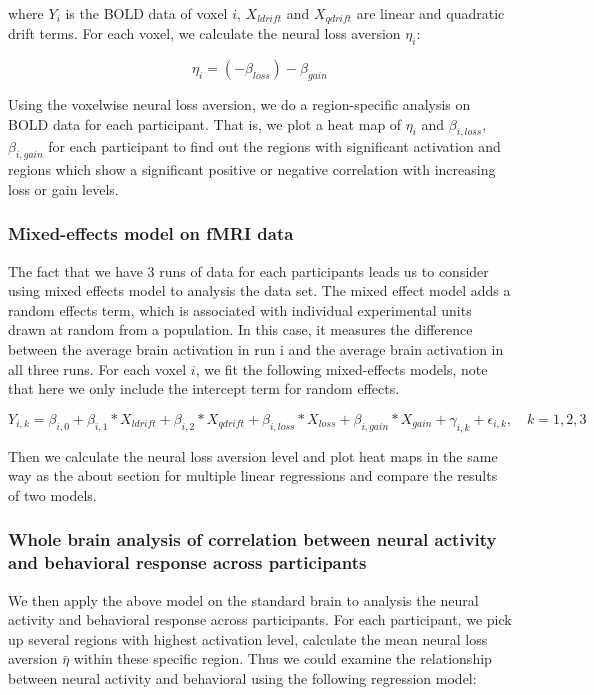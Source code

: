 \documentclass[11pt]{article}
\begin{document}
where $Y_{i}$ is the BOLD data of voxel $i$,  $X_{ldrift}$ and $X_{qdrift}$ are linear and quadratic drift terms. For each voxel, we calculate the 
neural loss aversion $\eta_i$:

\begin{equation}
\eta_i = (-\beta_{loss}) - \beta_{gain}
\end{equation}

Using the voxelwise neural loss aversion, we do a region-specific analysis on 
BOLD data for each participant. That is, we plot a heat map of $\eta_i$ and  
$\beta_{i, loss}$, $ \beta_{i, gain}$ for each participant to find out the 
regions with significant activation and regions which show a significant 
positive or negative correlation with increasing loss or gain levels.

\subsubsection{Mixed-effects model on fMRI data}

The fact that we have 3 runs of data for each participants leads us to consider using mixed effects model to analysis the data set. The mixed effect model adds a random effects term, which is associated with individual experimental units drawn at random from a population. In this case, it measures the difference between the average brain activation in run i and the 
average brain activation in all three runs. For each voxel $i$, we fit the following mixed-effects models, note that here we only include the intercept term for random effects. 

\begin{equation}
Y_{i, k} = \beta_{i, 0} + \beta_{i,1} *X_{ldrift} + \beta_{i, 2} * X_{qdrift} +  \beta_{i, loss} *X_{loss} + \beta_{i, gain} * X_{gain}  + \gamma _{i, k} + \epsilon_{i, k}, \quad k =1, 2, 3
\end{equation}

Then we calculate the neural loss aversion level and plot heat maps in the same way as the about section for multiple linear regressions and compare the results of two models. 

\subsubsection{Whole brain analysis of correlation between 
neural activity and behavioral response across participants}

We then apply the above model on the standard brain to analysis the neural 
activity and behavioral response across participants. For each participant, 
we pick up several regions with highest activation level, calculate the mean 
neural loss aversion $\bar{\eta}$ within these specific region. Thus we could 
examine the relationship between neural activity and behavioral using the 
following regression model:
\end{document}
